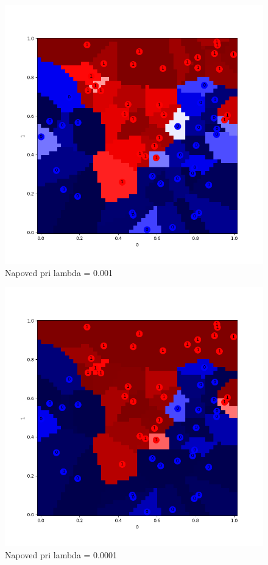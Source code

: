 \documentclass[a4paper,11pt]{article}
\begin{document}
\begin{figure}[H]
\begin{center}
\includegraphics[scale=0.3]{001.png}
\caption{Napoved pri lambda = 0.001}
\label{slika2}
\end{center}
\end{figure}

\begin{figure}[H]
\begin{center}
\includegraphics[scale=0.3]{0001.png}
\caption{Napoved pri lambda = 0.0001}
\label{slika3}
\end{center}
\end{figure}
\end{document}
